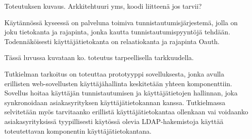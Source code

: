Toteutuksen kuvaus. Arkkitehtuuri yms, koodi liitteenä jos tarvii?

Käytännössä kyseessä on palveluna toimiva tunnistautumisjärjestemä, jolla on joku tietokanta ja rajapinta, jonka kautta tunnistautumispyyntöjä tehdään. Todennäköisesti käyttäjätietokanta on relaatiokanta ja rajapinta Oauth.

Tässä luvussa kuvataan ko. toteutus tarpeellisella tarkkuudella.

Tutkielman tarkoitus on toteuttaa prototyyppi sovelluksesta, jonka avulla erillisten web-sovellusten käyttäjähallinta keskitetään yhteen komponenttiin. Sovellus hoitaa käyttäjän tunnistautumisen ja käyttäjätietojen hallinnan, joka synkronoidaan asiakasyrityksen käyttäjätietokannan kanssa. Tutkielmassa selvitetään myös tarvitaanko erillistä käyttäjätietokantaa ollenkaan vai voidaanko asiakasyrityksissä tyypillisesti käytössä olevia LDAP-hakemistoja käyttää toteutettavan komponentin käyttäjätietokantana.